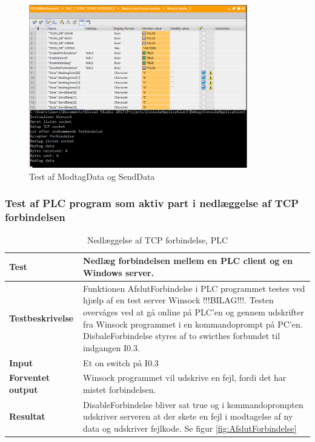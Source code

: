 \begin{figure}[H] %
	\centering
	\includegraphics[width=0.85\textwidth]{Test/ModultestStyringsenhed/ModtagDataOgSendData}
	\caption{Test af ModtagData og SendData}
	\label{fig:ModtagDataOgSendData}
\end{figure}

\subsubsection{Test af PLC program som aktiv part i nedlæggelse af TCP forbindelsen}

\begin{table}[H]
	\centering
	\begin{tabular}{ | m{} | m{}|} 
		\hline
		\textbf{Test}					&Nedlæg forbindelsen mellem en PLC client og en Windows server.\\ \hline
		\textbf{Testbeskrivelse}		&Funktionen AfslutForbindelse i PLC programmet testes ved hjælp af en test server Winsock !!!BILAG!!!. Testen overvåges ved at gå online på PLC'en og gennem udskrifter fra Winsock programmet i en kommandoprompt på PC'en. DisbaleForbindelse styres af to swicthes forbundet til indgangen I0.3. \\ \hline
		\textbf{Input}					& Et on switch på I0.3\\ \hline
		\textbf{Forventet output}		&Winsock programmet vil udskrive en fejl, fordi det har mistet forbindelsen. \\ \hline
		\textbf{Resultat}				&DisableForbindelse bliver sat true og i kommandoprompten udskriver serveren at der skete en fejl i modtagelse af ny data og udskriver fejlkode. Se figur \ref{fig:AfslutForbindelse} \\ \hline
	\end{tabular}
	\caption{Nedlæggelse af TCP forbindelse, PLC} 
	\label{tab:PLCnedlaegForbindelse}
\end{table}

